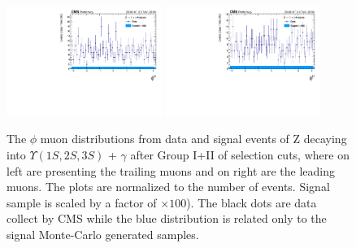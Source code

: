 \begin{figure}[!htbp]
\begin{center}
\includegraphics[width=0.45\textwidth]{figures_and_tables/outputPlots/ZtoUpsilon_Cat0_ZZZZZ/nEvts/data_x_mc/withKinCuts/h_withKin_TrailingMu_phi}\hspace*{1.cm}
\includegraphics[width=0.45\textwidth]{figures_and_tables/outputPlots/ZtoUpsilon_Cat0_ZZZZZ/nEvts/data_x_mc/withKinCuts/h_withKin_LeadingMu_phi}
\end{center}\vspace*{-.5cm}
\caption{The $\phi$ muon distributions from data and signal events of Z decaying into $\Upsilon(1S,2S,3S)$ + $\gamma$ after Group I+II of selection cuts, where on left are presenting the trailing muons and on right are the leading muons. The plots are normalized to the number of events. Signal sample is scaled by a factor of $\times 100$). The black dots are data collect by CMS while the blue distribution is related only to the signal Monte-Carlo generated samples.}
\label{fig:phiMuons_ZtoUpsilon_Cat0_groupI_plus_II}
\end{figure}


